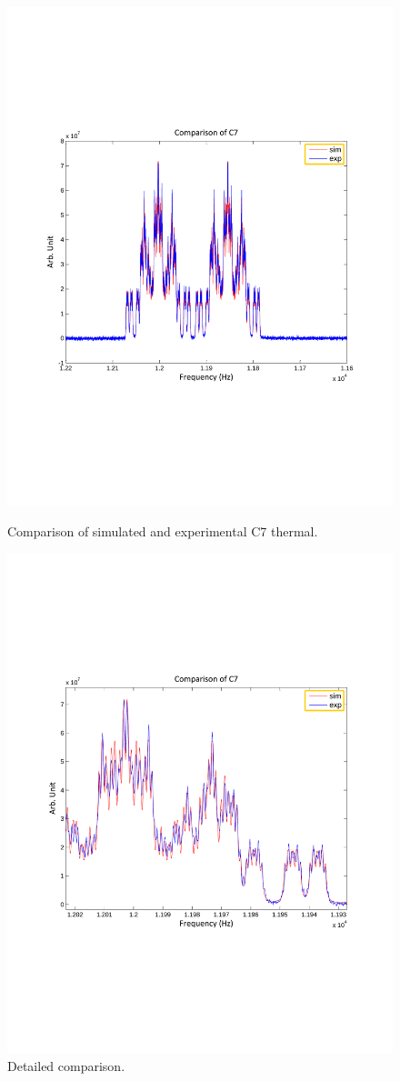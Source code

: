 \documentclass[prl,onecolumn]{revtex4-1}
\begin{document}
\begin{figure}
\begin{minipage}[hbtp]{0.5\linewidth}
\centering
\includegraphics[width=0.8\columnwidth]{comparison_C7.pdf}
\caption{Comparison of simulated and experimental C7 thermal.}
\label{fig:side:a}
\end{minipage}%
\begin{minipage}[hbtp]{0.5\linewidth}
\centering
\includegraphics[width=0.8\columnwidth]{comparison_C7_zoomin.pdf}
\caption{Detailed comparison.}
\label{fig:side:b}
\end{minipage}
\end{figure}
\end{document}
